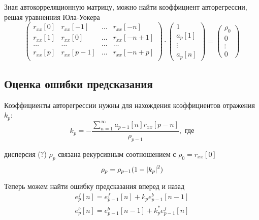 \documentclass[a4paper,14pt]{extarticle}
\begin{document}
Зная автокорреляционную матрицу, можно найти коэффициент авторегрессии, решая
уравненния Юла-Уокера
\begin{equation}
    \label{eq:Rxx2}
        \begin{pmatrix}
            r_{xx}[0] & r_{xx}[-1] & \dots &  r_{xx}[-n] \\
            r_{xx}[1] & r_{xx}[0] & \dots &  r_{xx}[-n+1] \\
            \dots  & \dots    & \dots & \dots   \\ 
            r_{xx}[p] & r_{xx}[p-1] & \dots &  r_{xx}[-n+p] \\
        \end{pmatrix}
        \cdot 
        \begin{pmatrix}
            1 \\
            a_p[1]\\
            \vdots\\
            a_p[n]
        \end{pmatrix}
        =
        \begin{pmatrix}
            \rho_0 \\
            0\\
            \vdots\\
            0
        \end{pmatrix}
\end{equation}

\subsection{Оценка ошибки предсказания}%
\label{sub:otsenka_oshibki_predskazaniia}


Коэффициенты авторегрессии нужны для нахождения коэффициентов отражения $k_p$:
\begin{equation}
    \label{eq:kp}
    k_p = - \frac{
                \sum\limits_{n=1}^{\infty} a_{p-1}[n] r_{xx}[p-n]
        }{
                \rho_{p-1}
        }, \text{ где}
\end{equation}

дисперсия (?) $\rho_p$ связана рекурсивным соотношением с $\rho_0 = r_{xx}[0]$
\begin{equation}
    \label{eq:}
    \rho_p = \rho_{p-1} (1 - \abs{k_p}^2)
\end{equation}

Теперь можем найти ошибку предсказания вперед и назад
\begin{align}
    \label{eq:err-front}
    e_p^f[n]  =  e_{p-1}^f[n]    + k_p e_{p-1}^b [n-1]\\
    \label{eq:err-back}
    e_p^b[n]  =  e_{p-1}^b[n-1]  + k_p^* e_{p-1}^f [n]\\
\end{align}
\end{document}

